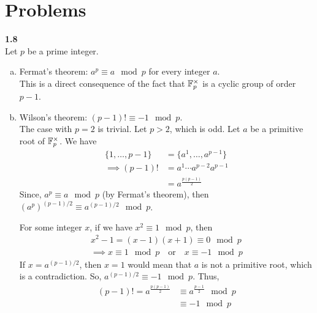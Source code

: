 \section{Problems}
\label{sec:problems}
\textbf{1.8}\\
Let $p$ be a prime integer.
\begin{enumerate}[(a)]
    \item Fermat's theorem: $a^p \equiv a \mod p$ for every integer $a$.\\
        This is a direct consequence of the fact that $\mathbb{F}_p^\times$ is a cyclic group of order $p-1$.
    \item Wilson's theorem: $(p-1)! \equiv -1 \mod p$.\\
        The case with $p=2$ is trivial. Let $p>2$, which is odd.
        Let $a$ be a primitive root of $\mathbb{F}_p^\times$. We have
        \begin{align*}
            \{1,\dotsc,p-1\} &= \{a^1,\dotsc,a^{p-1}\} \\
            \implies (p-1)! &= a^1 \cdots a^{p-2} a^{p-1}\\
                &= a^{\frac{p(p-1)}{2}} 
        \end{align*}
        Since, $a^{p}\equiv a \mod p$ (by Fermat's theorem), then $(a^{p})^{(p-1)/2}\equiv a^{(p-1)/2} \mod p$. 

        For some integer $x$, if we have $x^2 \equiv 1\mod p$, then
        \begin{align*}
            x^2 - 1 = (x-1)(x+1)  \equiv 0 \mod p\\
            \implies x \equiv 1 \mod p\quad\text{or}\quad x\equiv -1 \mod p
        \end{align*}
        If $x=a^{(p-1)/2}$, then $x=1$ would mean that $a$ is not a primitive root, which is a contradiction. So, $a^{(p-1)/2} \equiv -1 \mod p$. Thus,
        \begin{align*}
            (p-1)! = a^{\frac{p(p-1)}{2}} &\equiv a^{\frac{p-1}{2}} \mod p \\
            &\equiv -1 \mod p
        \end{align*}
        \qedsymbol
\end{enumerate}





